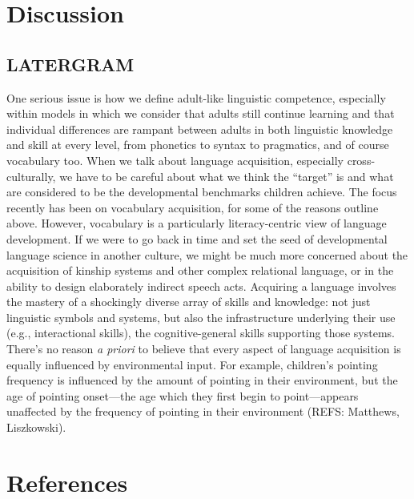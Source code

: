 \documentclass[man]{apa6}
\theoremstyle{definition}
\theoremstyle{definition}
\theoremstyle{definition}
\theoremstyle{remark}
\begin{document}
\section{Discussion}\label{discussion}

\subsection{LATERGRAM}\label{latergram}

One serious issue is how we define adult-like linguistic competence,
especially within models in which we consider that adults still continue
learning and that individual differences are rampant between adults in
both linguistic knowledge and skill at every level, from phonetics to
syntax to pragmatics, and of course vocabulary too. When we talk about
language acquisition, especially cross-culturally, we have to be careful
about what we think the ``target'' is and what are considered to be the
developmental benchmarks children achieve. The focus recently has been
on vocabulary acquisition, for some of the reasons outline above.
However, vocabulary is a particularly literacy-centric view of language
development. If we were to go back in time and set the seed of
developmental language science in another culture, we might be much more
concerned about the acquisition of kinship systems and other complex
relational language, or in the ability to design elaborately indirect
speech acts. Acquiring a language involves the mastery of a shockingly
diverse array of skills and knowledge: not just linguistic symbols and
systems, but also the infrastructure underlying their use (e.g.,
interactional skills), the cognitive-general skills supporting those
systems. There's no reason \emph{a priori} to believe that every aspect
of language acquisition is equally influenced by environmental input.
For example, children's pointing frequency is influenced by the amount
of pointing in their environment, but the age of pointing onset---the
age which they first begin to point---appears unaffected by the
frequency of pointing in their environment (REFS: Matthews, Liszkowski).

\newpage

\section{References}\label{references}

\begingroup
\setlength{\parindent}{-0.5in} \setlength{\leftskip}{0.5in}

\hypertarget{refs}{}

\endgroup
\end{document}
